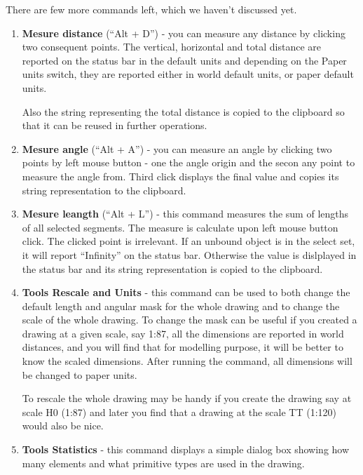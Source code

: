 There are few more commands left, which we haven't discussed yet.
\begin{enumerate}
\item \textbf{Mesure distance} (``Alt + D'') - you can measure any distance
by clicking two consequent points. The vertical, horizontal and total distance
are reported on the status bar in the default units and depending on the Paper
units switch, they are reported either in world default units, or paper default
units.

Also the string representing the total distance is copied to the clipboard so that
it can be reused in further operations.

\item \textbf{Mesure angle} (``Alt + A'') - you can measure an angle by clicking
two points by left mouse button - one the angle origin and the secon any point
to measure the angle from. Third click displays the final value and copies its
string representation to the clipboard.

\item \textbf{Mesure leangth} (``Alt + L'') - this command measures the sum of
lengths of all selected segments. The measure is calculate upon left mouse button
click. The clicked point is irrelevant. If an unbound object is in the select set,
it will report ``Infinity'' on the status bar. Otherwise the value is dislplayed
in the status bar and its string representation is copied to the clipboard.

\item \textbf{Tools \lar{} Rescale and Units} - this command can be used to
both change the default length and angular mask for the whole drawing and to
change the scale of the whole drawing. To change the mask can be useful if you
created a drawing at a given scale, say 1:87, all the dimensions are reported
in world distances, and you will find that for modelling purpose, it will be
better to know the scaled dimensions. After running the command, all dimensions
will be changed to paper units.

To rescale the whole drawing may be handy if you create the drawing say at
scale H0 (1:87) and later you find that a drawing at the scale TT (1:120) would
also be nice.
\item \textbf{Tools \lar{} Statistics} - this command displays a simple dialog box showing how
many elements and what primitive types are used in the drawing.
\end{enumerate}


